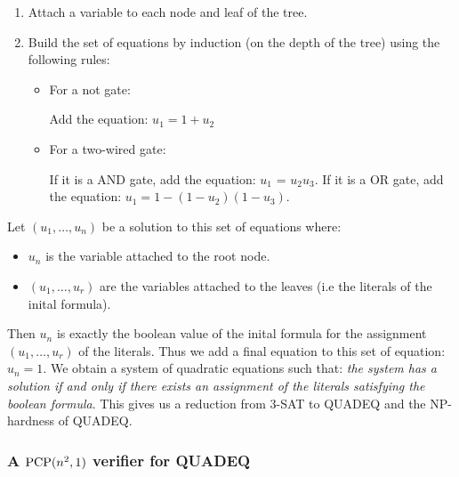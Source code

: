 \begin{enumerate}
\item Attach a variable to each node and leaf of the tree.
\item Build the set of equations by induction (on the depth of the tree) using
the following rules:
\begin{itemize}
 \item For a not gate:
\begin{figure}[h]
\begin{center}
\end{center}
\end{figure}

Add the equation: $u_1 = 1+u_2$
\item For a two-wired gate:
\begin{figure}[!h]
\begin{center}
\end{center}
\end{figure}

If it is a \textsf{AND} gate, add the equation: $u_1$ = $u_2u_3$. If it is a
\textsf{OR} gate, add the equation: $u_1 = 1 - (1-u_2)(1-u_3)$.
\end{itemize}
\end{enumerate}

Let $(u_1,\ldots,u_n)$ be a solution to this set of equations where:
\begin{itemize}
 \item $u_n$ is the variable attached to the root node.
\item $(u_1,\ldots,u_r)$ are the variables attached to the leaves (i.e the
literals of the inital formula).
\end{itemize}
Then $u_n$ is exactly the boolean value of the inital formula for the
assignment $(u_1,\ldots,u_r)$ of the literals. Thus we add a final equation to
this set of equation: $u_n=1$. We obtain a system of quadratic equations
such that: \emph{the system has a solution if and only if there
exists an assignment of the literals satisfying the boolean formula}. This
gives us a reduction from \textsf{3-SAT} to \textsf{QUADEQ} and the NP-hardness
of \textsf{QUADEQ}.

\newpage
\subsubsection{A $\mathrm{PCP}(n^2,1)$ verifier for \textsf{QUADEQ}}

